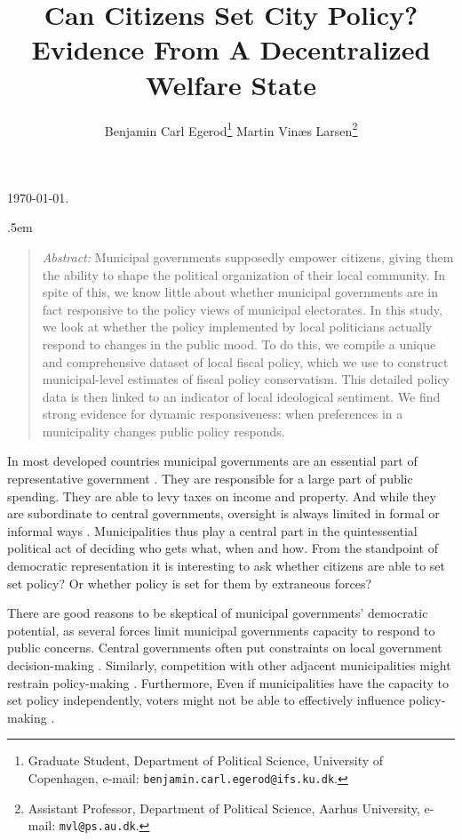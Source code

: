 \documentclass[a4paper,12pt]{article}
\title{\bigskip \bigskip \sffamily \LARGE{Can Citizens Set City Policy?} \\ \Large{ Evidence From A Decentralized Welfare State}}
\author{\bigskip Benjamin Carl Egerod\footnote[2]{Graduate Student, Department of Political Science, University of Copenhagen, e-mail: \texttt{benjamin.carl.egerod@ifs.ku.dk}.} \qquad Martin Vinæs Larsen\footnote[3]{Assistant Professor, Department of Political Science, Aarhus University, e-mail: \texttt{mvl@ps.au.dk}.}}
\makeatletter
\renewcommand{\maketitle}{
	\begin{flushleft}
		
		\onehalfspacing
		
		\@title
		
		\lineskip .5em
		\normalfont{\normalsize{\@author}}
\end{flushleft}}
\makeatother
\begin{document}
	
	\begin{footnotesize} \noindent \today. \end{footnotesize} %
	
	\vspace{0.7in}
	
	\maketitle
	
	\bigskip
	
	\begin{quotation} %

		\small \noindent \emph{Abstract:} Municipal governments supposedly empower citizens, giving them the ability to shape the political organization of their local community. In spite of this, we know little about whether municipal governments are in fact responsive to the policy views of municipal electorates. In this study, we look at whether the policy implemented by local politicians actually respond to changes in the public mood. To do this, we compile a unique and comprehensive dataset of local fiscal policy, which we use to construct municipal-level estimates of fiscal policy conservatism. This detailed policy data is then linked to an indicator of local ideological sentiment. We find strong evidence for dynamic responsiveness: when preferences in a municipality changes public policy responds.
	\end{quotation}



	
	\thispagestyle{empty} %
	
	
\clearpage


\noindent In most developed countries municipal governments are an essential part of representative government \citep{trounstine2009all,kersting2013reforming}. They are responsible for a large part of public spending.  They are able to levy taxes on income and property. And while they are subordinate to central governments, oversight is always limited in formal or informal ways \citep{oecd2016subnational}. Municipalities thus play a central part in the quintessential political act of deciding who gets what, when and how. From the standpoint of democratic representation it is interesting to ask whether citizens are able to set set policy? Or whether policy is set for them by extraneous forces?

There are good reasons to be skeptical of municipal governments' democratic potential, as  several forces limit municipal governments capacity to respond to public concerns. Central governments often put constraints on local government decision-making \citep{peterson1981city}. Similarly, competition with other adjacent municipalities might restrain policy-making \citep{salmon2006horizontal,tiebout1956pure}. Furthermore, Even if municipalities have the capacity to set policy independently, voters might not be able to effectively influence policy-making \citep[e.g.,][]{sances2017attribution,gerber2011mayors}. 
\end{document}
